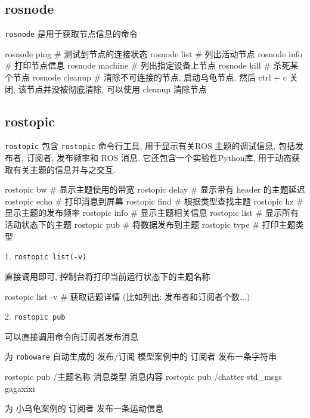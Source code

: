 \documentclass[openany, fontset=windowsold]{ctexbook}
\theoremstyle{kaiti}
\theoremstyle{normal}
\begin{document}
\subsection{rosnode}

\verb|rosnode| 是用于获取节点信息的命令

\begin{bash}
  rosnode ping        # 测试到节点的连接状态
  rosnode list        # 列出活动节点
  rosnode info        # 打印节点信息
  rosnode machine     # 列出指定设备上节点
  rosnode kill        # 杀死某个节点
  rosnode cleanup     # 清除不可连接的节点, 启动乌龟节点, 然后 ctrl + c 关闭, 该节点并没被彻底清除, 可以使用 cleanup 清除节点
\end{bash}

\subsection{rostopic}

\verb|rostopic| 包含 \verb|rostopic| 命令行工具, 用于显示有关ROS 主题的调试信息, 包括发布者, 订阅者, 发布频率和 ROS 消息. 它还包含一个实验性Python库, 用于动态获取有关主题的信息并与之交互.

\begin{bash}
  rostopic bw     # 显示主题使用的带宽
  rostopic delay  # 显示带有 header 的主题延迟
  rostopic echo   # 打印消息到屏幕
  rostopic find   # 根据类型查找主题
  rostopic hz     # 显示主题的发布频率
  rostopic info   # 显示主题相关信息
  rostopic list   # 显示所有活动状态下的主题
  rostopic pub    # 将数据发布到主题
  rostopic type   # 打印主题类型
\end{bash}

1. \verb|rostopic list(-v)|

直接调用即可, 控制台将打印当前运行状态下的主题名称

\begin{bash}
  rostopic list -v # 获取话题详情 (比如列出: 发布者和订阅者个数...)
\end{bash}

2. \verb|rostopic pub|

可以直接调用命令向订阅者发布消息

为 \verb|roboware| 自动生成的 发布/订阅 模型案例中的 订阅者 发布一条字符串

\begin{bash}
  rostopic pub /主题名称 消息类型 消息内容
  rostopic pub /chatter std_msgs gagaxixi
\end{bash}

为 小乌龟案例的 订阅者 发布一条运动信息
\end{document}
